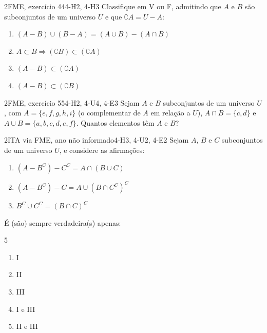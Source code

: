 \begin{questao}{2}{FME, exercício 44}{4-H2, 4-H3}\label{u4:fme44}
Classifique em V ou F, admitindo que $A$ e $B$ são subconjuntos de um universo $U$ e que $\complement A=U-A$:
\begin{enumerate}[label=\alph*)]
  \item $(A-B)\cup(B-A)=(A\cup B)-(A\cap B)$
  \item $A\subset B\Rightarrow(\complement B)\subset(\complement A)$
  \item $(A-B)\subset(\complement A)$
  \item $(A-B)\subset(\complement B)$
\end{enumerate}
\end{questao}

\begin{questao}{2}{FME, exercício 55}{4-H2, 4-U4, 4-E3}\label{u4:fme55}
Sejam $A$ e $B$ subconjuntos de um universo $U$, com $\overline{A}=\{e,f,g,h,i\}$ (o complementar de $A$ em relação a $U$), $A\cap B=\{c,d\}$ e $A\cup B=\{a,b,c,d,e,f\}$. Quantos elementos têm $A$ e $B$?
\end{questao}

\begin{questao}{2}{ITA via FME, ano não informado}{4-H3, 4-U2, 4-E2}\label{u4:ita42}
Sejam $A$, $B$ e $C$ subconjuntos de um universo $U$, e considere as afirmações:
\begin{enumerate}[label=\Roman*.]
  \item $(A-B^{C})-C^{C}=A\cap(B\cup C)$
  \item $(A-B^{C})-C=A\cup(B\cap C^{C})^{C}$
  \item $B^{C}\cup C^{C}=(B\cap C)^{C}$
\end{enumerate}
É (são) sempre verdadeira(s) apenas:
\begin{multicols}{5}
\begin{enumerate}[label=\alph*)]
  \item I
  \item II
  \item III
  \item I e III
  \item II e III
\end{enumerate}
\end{multicols}
\end{questao}

